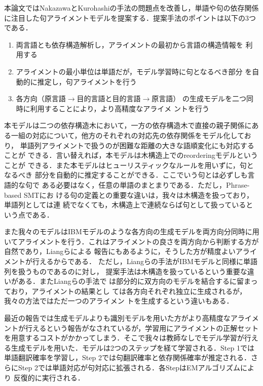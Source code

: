 \documentclass[japanese]{jnlp_1.4}
\begin{document}
本論文ではNakazawaとKurohashiの手法の問題点を改善し，単語や句の依存関係
に注目した句アライメントモデルを提案する．提案手法のポイントは以下の3つ
である．
\begin{enumerate}
 \item 両言語とも依存構造解析し，アライメントの最初から言語の構造情報を
       利用する \label{point1}
 \item アライメントの最小単位は単語だが，モデル学習時に句となるべき部分
       を自動的に推定し，句アライメントを行う \label{point2}
 \item 各方向（原言語$\rightarrow$目的言語と目的言語$\rightarrow$原言語）
       の生成モデルを二つ同時に利用することにより，より高精度なアライメ
       ントを行う \label{point3}
\end{enumerate}

本モデルは二つの依存構造木において，一方の依存構造木で直接の親子関係にあ
る一組の対応について，他方のそれぞれの対応先の依存関係をモデル化しており，
単語列アライメントで扱うのが困難な距離の大きな語順変化にも対応することが
できる．言い替えれば，本モデルは木構造上でのreorderingモデルということが
できる．また本モデルはヒューリスティックなルールを用いずに，句となるべき
部分を自動的に推定することができる．ここでいう句とは必ずしも言語的な句で
ある必要はなく，任意の単語のまとまりである．ただし，Phrase-based SMTにお
ける句の定義との重要な違いは，我々は木構造を扱っており，単語列としては連
続でなくても，木構造上で連続ならば句として扱っているという点である．

また我々のモデルはIBMモデルのような各方向の生成モデルを両方向分同時に用
いてアライメントを行う．これはアライメントの良さを両方向から判断する方が
自然であり，Liangら\cite{liang-taskar-klein:2006:HLT-NAACL06-Main}による
報告にもあるように，そうした方が精度よいアライメントが行えるからである．
ただし，Liangらの手法がIBMモデルと同様に単語列を扱うものであるのに対し，
提案手法は木構造を扱っているという重要な違いがある．またLiangらの手法で
は部分的に双方向のモデルを結合するに留まっており，アライメントの結果とし
ては各方向それぞれ独立に生成されるが，我々の方法ではただ一つのアライメン
トを生成するという違いもある．

最近の報告では生成モデルよりも識別モデルを用いた方がより高精度なアライメ
ントが行えるという報告がなされているが，学習用にアライメントの正解セット
を用意するコストがかかってしまう．そこで我々は教師なしでモデル学習が行え
る生成モデルを用いた．モデルは2つのステップを経て学習される．Step 1では
単語翻訳確率を学習し，Step 2では句翻訳確率と依存関係確率が推定される．さ
らにStep 2では単語対応が句対応に拡張される．各StepはEMアルゴリズムにより
反復的に実行される．
\end{document}
